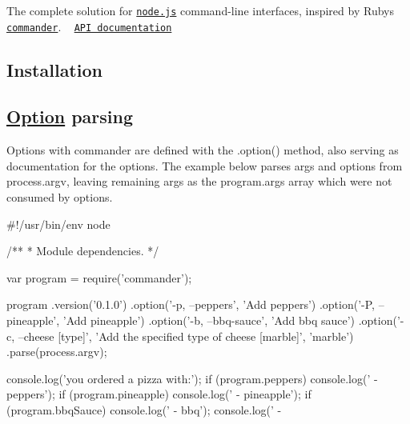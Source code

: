 \href{http://travis-ci.org/tj/commander.js}{\tt } \href{https://www.npmjs.org/package/commander}{\tt } \href{https://npmcharts.com/compare/commander?minimal=true}{\tt } \href{https://packagephobia.now.sh/result?p=commander}{\tt } \href{https://gitter.im/tj/commander.js?utm_source=badge&utm_medium=badge&utm_campaign=pr-badge&utm_content=badge}{\tt }

The complete solution for \href{http://nodejs.org}{\tt node.\+js} command-\/line interfaces, inspired by Ruby\textquotesingle{}s \href{https://github.com/commander-rb/commander}{\tt commander}. ~\newline
 \href{http://tj.github.com/commander.js/}{\tt A\+PI documentation}

\subsection*{Installation}



\subsection*{\mbox{\hyperlink{structOption}{Option}} parsing}

Options with commander are defined with the {\ttfamily .option()} method, also serving as documentation for the options. The example below parses args and options from {\ttfamily process.\+argv}, leaving remaining args as the {\ttfamily program.\+args} array which were not consumed by options.


\begin{DoxyCode}
#!/usr/bin/env node

/**
 * Module dependencies.
 */

var program = require('commander');

program
  .version('0.1.0')
  .option('-p, --peppers', 'Add peppers')
  .option('-P, --pineapple', 'Add pineapple')
  .option('-b, --bbq-sauce', 'Add bbq sauce')
  .option('-c, --cheese [type]', 'Add the specified type of cheese [marble]', 'marble')
  .parse(process.argv);

console.log('you ordered a pizza with:');
if (program.peppers) console.log('  - peppers');
if (program.pineapple) console.log('  - pineapple');
if (program.bbqSauce) console.log('  - bbq');
console.log('  - %
\end{DoxyCode}



